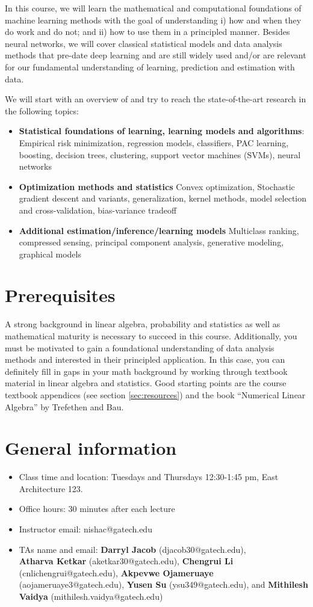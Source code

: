 \documentclass[12pt]{article}
\begin{document}
\MakeScribeTop

In this course, we will learn the mathematical and computational foundations of machine learning methods with the goal of understanding i) how and when they do work and do not; and ii) how to use them in a principled manner. Besides neural networks, we will cover classical statistical models and data analysis methods that pre-date deep learning and are still widely used and/or are relevant for our fundamental understanding of learning, prediction and estimation with data.

We will start with an overview of and try to reach the state-of-the-art research in the following topics:
\begin{itemize}
	\item \textbf{Statistical foundations of learning, learning models and algorithms}: Empirical risk minimization, regression models, classifiers, PAC learning, boosting, decision trees, clustering, support vector machines (SVMs), neural networks 
	\item \textbf{Optimization methods and statistics} Convex optimization, Stochastic gradient descent and variants, generalization, kernel methods, model selection and cross-validation, bias-variance tradeoff
	\item \textbf{Additional estimation/inference/learning models} Multiclass ranking, compressed sensing, principal component analysis, generative modeling, graphical models
\end{itemize}
\section{Prerequisites}
A strong background in linear algebra, probability and statistics as well as mathematical maturity is necessary to succeed in this course. Additionally, you must be motivated to gain a foundational understanding of data analysis methods and interested in their principled application. In this case, you can definitely fill in gaps in your math background by working through textbook material in linear algebra and statistics. Good starting points are the course textbook appendices (see section \ref{sec:resources}) and the book ``Numerical Linear Algebra'' by Trefethen and Bau. 
\section{General information}
\begin{itemize}
	\item Class time and location: Tuesdays and Thursdays 12:30-1:45 pm, East Architecture 123.
	\item Office hours: 30 minutes after each lecture
	\item Instructor email: nishac@gatech.edu
	\item TAs name and email: \textbf{Darryl Jacob} (djacob30@gatech.edu), 
		\\ \textbf{Atharva Ketkar} (aketkar30@gatech.edu),
		\textbf{Chengrui Li} (cnlichengrui@gatech.edu), 
		\textbf{Akpevwe Ojameruaye} (aojameruaye3@gatech.edu), 
		\textbf{Yusen Su} (ysu349@gatech.edu), 
		and \textbf{Mithilesh Vaidya} (mithilesh.vaidya@gatech.edu) 
\end{itemize}
\end{document}
